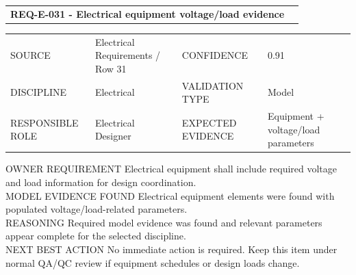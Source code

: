 \documentclass[10pt,letterpaper]{article}
\newcommand{\smalllabel}[1]{{\scriptsize\textcolor{emaMuted}{\MakeUppercase{#1}}}}
\newcommand{\badge}[3]{\tcbox[on line,colback=#2,colframe=#2,boxrule=0pt,arc=2mm,left=5pt,right=5pt,top=2pt,bottom=2pt]{\scriptsize\textbf{\textcolor{#3}{#1}}}}
\newcommand{\metbadge}{\badge{Met}{emaGreenBg}{emaGreen}}
\begin{document}
\begin{tcolorbox}[colback=white,colframe=emaGreenBg,boxrule=0.9pt,borderline west={3pt}{0pt}{emaGreen}]
\begin{tabularx}{\textwidth}{X r}
{\large\bfseries\textcolor{emaNavy}{REQ-E-031 - Electrical equipment voltage/load evidence}} & \metbadge \\
\end{tabularx}
\begin{tabularx}{\textwidth}{p{1.25in}X p{1.1in}X}
\smalllabel{Source} & Electrical Requirements / Row 31 & \smalllabel{Confidence} & 0.91 \\
\smalllabel{Discipline} & Electrical & \smalllabel{Validation Type} & Model \\
\smalllabel{Responsible Role} & Electrical Designer & \smalllabel{Expected Evidence} & Equipment + voltage/load parameters \\
\end{tabularx}
\smalllabel{Owner Requirement} Electrical equipment shall include required voltage and load information for design coordination.\\[3pt]
\smalllabel{Model Evidence Found} Electrical equipment elements were found with populated voltage/load-related parameters.\\[3pt]
\smalllabel{Reasoning} Required model evidence was found and relevant parameters appear complete for the selected discipline.\\[3pt]
\smalllabel{Next Best Action} No immediate action is required. Keep this item under normal QA/QC review if equipment schedules or design loads change.
\end{tcolorbox}
\end{document}

